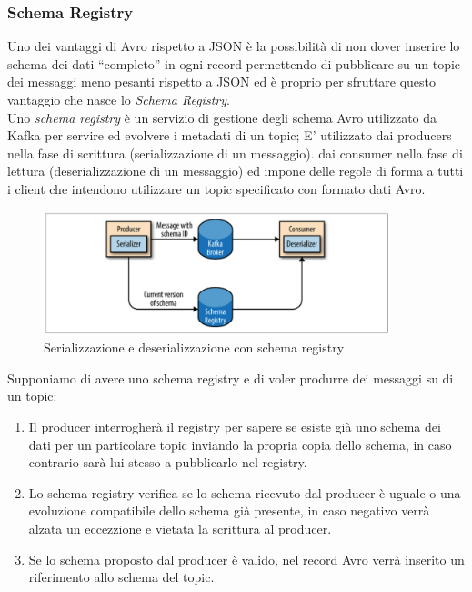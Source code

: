 \documentclass[]{article}
\providecommand{\tightlist}{%
  \setlength{\itemsep}{0pt}\setlength{\parskip}{0pt}}
\begin{document}
\newpage

\subsubsection{Schema Registry}\label{schema-registry}

Uno dei vantaggi di Avro rispetto a JSON è la possibilità di non dover
inserire lo schema dei dati ``completo'' in ogni record permettendo di
pubblicare su un topic dei messaggi meno pesanti rispetto a JSON ed è
proprio per sfruttare questo vantaggio che nasce lo \emph{Schema
Registry}.\\
Uno \emph{schema registry} è un servizio di gestione degli schema Avro
utilizzato da Kafka per servire ed evolvere i metadati di un topic; E'
utilizzato dai producers nella fase di scrittura (serializzazione di un
messaggio). dai consumer nella fase di lettura (deserializzazione di un
messaggio) ed impone delle regole di forma a tutti i client che
intendono utilizzare un topic specificato con formato dati Avro.

\begin{figure}
\centering
\includegraphics[width=0.90000\textwidth]{../images/schema-registry.png}
\caption{Serializzazione e deserializzazione con schema registry
\label{figure_5}}
\end{figure}

Supponiamo di avere uno schema registry e di voler produrre dei messaggi
su di un topic:

\begin{enumerate}
\def\labelenumi{\arabic{enumi}.}
\tightlist
\item
  Il producer interrogherà il registry per sapere se esiste già uno
  schema dei dati per un particolare topic inviando la propria copia
  dello schema, in caso contrario sarà lui stesso a pubblicarlo nel
  registry.
\item
  Lo schema registry verifica se lo schema ricevuto dal producer è
  uguale o una evoluzione compatibile dello schema già presente, in caso
  negativo verrà alzata un eccezzione e vietata la scrittura al
  producer.
\item
  Se lo schema proposto dal producer è valido, nel record Avro verrà
  inserito un riferimento allo schema del topic.
\end{enumerate}
\end{document}

